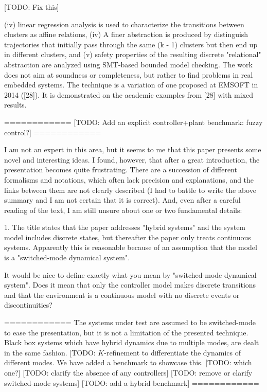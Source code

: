 [TODO: Fix this]

(iv)
linear regression analysis is used to characterize the transitions between
clusters as affine relations, (iv) A finer abstraction is produced by
distinguish trajectories that initially pass through the same (k - 1)
clusters but then end up in different clusters, and (v) safety properties of
the resulting discrete "relational" abstraction are analyzed using SMT-based
bounded model checking. The work does not aim at soundness or completeness,
but rather to find problems in real embedded systems. The technique is a
variation of one proposed at EMSOFT in 2014 ([28]). It is demonstrated on
the academic examples from [28] with mixed results.

   ============
   [TODO: Add an explicit controller+plant benchmark: fuzzy control?]
   ============

I am not an expert in this area, but it seems to me that this paper presents
some novel and interesting ideas. I found, however, that after a great
introduction, the presentation becomes quite frustrating. There are a
succession of different formalisms and notations, which often lack precision
and explanations, and the links between them are not clearly described (I
had to battle to write the above summary and I am not certain that it is
correct). And, even after a careful reading of the text, I am still unsure
about one or two fundamental details:

1. The title states that the paper addresses "hybrid systems" and the system
   model includes discrete states, but thereafter the paper only treats
   continuous systems. Apparently this is reasonable because of an
   assumption that the model is a "switched-mode dynamical system".

   It would be nice to define exactly what you mean by "switched-mode
   dynamical system". Does it mean that only the controller model makes
   discrete transitions and that the environment is a continuous model with
   no discrete events or discontinuities?

   ============
   The systems under test are assumed to be switched-mode to ease the
   presentation, but it is not a limitation of the presented
   technique. Black box systems which have hybrid dynamics due to
   multiple modes, are dealt in the same fashion.
   [TODO: $K$-refinement to differentiate the dynamics of different modes.
   We have added a benchmark to showcase this.
   [TODO: which one?]
   [TODO: clarify the absence of any controllers]
   [TODO: remove or clarify switched-mode systems]
   [TODO: add a hybrid benchmark]
   ============

